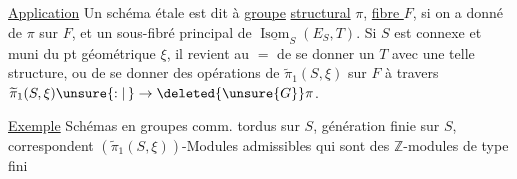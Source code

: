 \uline{Application} Un schéma étale  est dit à \uline{groupe}
\uline{structural} $\pi$, \uline{fibre $F$}, si on a
donné  de $\pi$ sur $F$,
et un sous-fibré  principal de
$\underline{\operatorname{Isom}}_S(E_S,T)$. Si $S$ est connexe et
muni du pt géométrique $\xi$, il revient
au $=$ de se donner un $T$ avec
une telle structure, ou de se
donner des opérations 
de $\widetilde{\pi}_1(S,\xi)$  sur $F$ à
travers $\widetilde{\pi}_1(S,\xi)\unsure{:|\,}\to\deleted{\unsure{G}}\pi$.

\uline{Exemple} Schémas en groupes comm.
 tordus sur $S$,  
génération finie sur $S$, correspondent
 $(\widetilde{\pi}_1(S,\xi))$-Modules admissibles
 qui sont des $\mathbb Z$-modules
de type fini \unsure{---}
